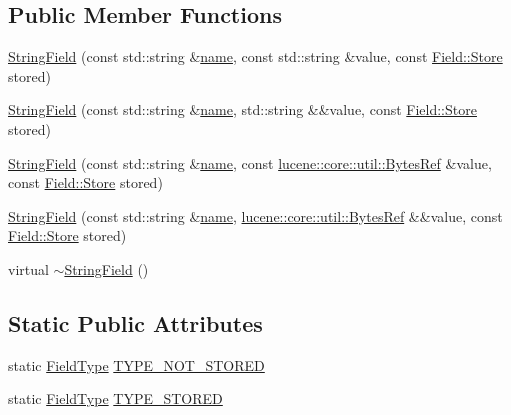 \subsection*{Public Member Functions}
\begin{DoxyCompactItemize}
\item 
\mbox{\hyperlink{classlucene_1_1core_1_1document_1_1StringField_af114024658947018095142ba97f04658}{String\+Field}} (const std\+::string \&\mbox{\hyperlink{classlucene_1_1core_1_1document_1_1Field_a52f673f3b3abb14b180f5159f4726537}{name}}, const std\+::string \&value, const \mbox{\hyperlink{classlucene_1_1core_1_1document_1_1Field_a7d5d79f0c56d3548ab8d46d0e7dae35d}{Field\+::\+Store}} stored)
\item 
\mbox{\hyperlink{classlucene_1_1core_1_1document_1_1StringField_afec933d8b7bd771b1e00e00e0a5290d0}{String\+Field}} (const std\+::string \&\mbox{\hyperlink{classlucene_1_1core_1_1document_1_1Field_a52f673f3b3abb14b180f5159f4726537}{name}}, std\+::string \&\&value, const \mbox{\hyperlink{classlucene_1_1core_1_1document_1_1Field_a7d5d79f0c56d3548ab8d46d0e7dae35d}{Field\+::\+Store}} stored)
\item 
\mbox{\hyperlink{classlucene_1_1core_1_1document_1_1StringField_ac1d3b420656ad92b14efb3c9c955d8a1}{String\+Field}} (const std\+::string \&\mbox{\hyperlink{classlucene_1_1core_1_1document_1_1Field_a52f673f3b3abb14b180f5159f4726537}{name}}, const \mbox{\hyperlink{classlucene_1_1core_1_1util_1_1BytesRef}{lucene\+::core\+::util\+::\+Bytes\+Ref}} \&value, const \mbox{\hyperlink{classlucene_1_1core_1_1document_1_1Field_a7d5d79f0c56d3548ab8d46d0e7dae35d}{Field\+::\+Store}} stored)
\item 
\mbox{\hyperlink{classlucene_1_1core_1_1document_1_1StringField_a33a7cc4352b3c8740bcca051c2ee3021}{String\+Field}} (const std\+::string \&\mbox{\hyperlink{classlucene_1_1core_1_1document_1_1Field_a52f673f3b3abb14b180f5159f4726537}{name}}, \mbox{\hyperlink{classlucene_1_1core_1_1util_1_1BytesRef}{lucene\+::core\+::util\+::\+Bytes\+Ref}} \&\&value, const \mbox{\hyperlink{classlucene_1_1core_1_1document_1_1Field_a7d5d79f0c56d3548ab8d46d0e7dae35d}{Field\+::\+Store}} stored)
\item 
virtual \mbox{\hyperlink{classlucene_1_1core_1_1document_1_1StringField_a36b6607f9e292e3d2eb8beded051591e}{$\sim$\+String\+Field}} ()
\end{DoxyCompactItemize}
\subsection*{Static Public Attributes}
\begin{DoxyCompactItemize}
\item 
static \mbox{\hyperlink{classlucene_1_1core_1_1document_1_1FieldType}{Field\+Type}} \mbox{\hyperlink{classlucene_1_1core_1_1document_1_1StringField_a098fa2afb00e417e8b811cf8ef410eb7}{T\+Y\+P\+E\+\_\+\+N\+O\+T\+\_\+\+S\+T\+O\+R\+ED}}
\item 
static \mbox{\hyperlink{classlucene_1_1core_1_1document_1_1FieldType}{Field\+Type}} \mbox{\hyperlink{classlucene_1_1core_1_1document_1_1StringField_aca1223a0a169a61b12b1168d35e4c5e7}{T\+Y\+P\+E\+\_\+\+S\+T\+O\+R\+ED}}
\end{DoxyCompactItemize}
